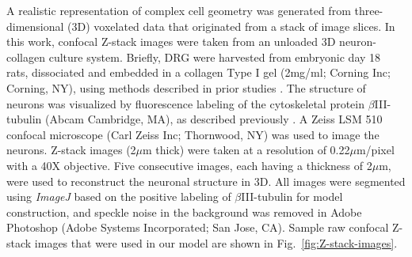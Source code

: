 \documentclass[]{interact}
\begin{document}
A realistic representation of complex cell geometry was generated from three-dimensional (3D) voxelated data that originated from a stack of image slices. In this work, confocal Z-stack images were taken from an unloaded 3D neuron-collagen culture system. Briefly, DRG were harvested from embryonic day 18 rats, dissociated and embedded in a collagen Type I gel (2mg/ml; Corning Inc; Corning, NY), using methods described in prior studies \citep{Cullen:2012gu, Zhang:2016ga, Zhang:2017gr}. The structure of neurons was visualized by fluorescence labeling of the cytoskeletal protein $\beta$III-tubulin (Abcam Cambridge, MA), as described previously \citep{Zhang:2016ga, Zhang:2017gr}. A Zeiss LSM 510 confocal microscope (Carl Zeiss Inc; Thornwood, NY) was used to image the neurons.  Z-stack images (2$\mu$m thick) were taken at a resolution of 0.22$\mu$m/pixel with a 40X objective. Five consecutive images, each having a thickness of 2$\mu$m, were used to reconstruct the neuronal structure in 3D. All images were segmented using \textit{ImageJ} \citep{Schneider:2012dw} based on the positive labeling of $\beta$III-tubulin for model construction, and speckle noise in the background was removed in Adobe Photoshop (Adobe Systems Incorporated; San Jose, CA). Sample raw confocal Z-stack images that were used in our model are shown in Fig.\ \ref{fig:Z-stack-images}. 
%
\end{document}
